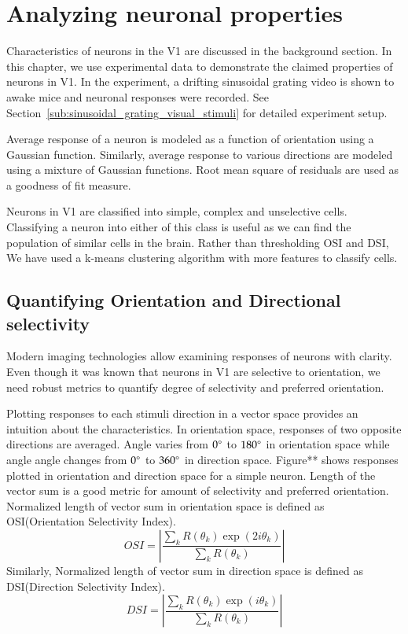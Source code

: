 \documentclass[MTech]{iitmdiss}
\begin{document}
\chapter{Analyzing neuronal properties} %
\label{chap:searchmotif}
Characteristics of neurons in the V1 are discussed in the background section. In this chapter, we use experimental data to demonstrate the claimed properties of neurons in V1. In the experiment, a drifting sinusoidal grating video is shown to awake mice and neuronal responses were recorded. See Section~\ref{sub:sinusoidal_grating_visual_stimuli} for detailed experiment setup. 

Average response of a neuron is modeled as a function of orientation using a Gaussian function. Similarly, average response to various directions are modeled using a mixture of Gaussian functions. Root mean square of residuals are used as a goodness of fit measure.

Neurons in V1 are classified into simple, complex and unselective cells. Classifying a neuron into either of this class is useful as we can find the population of similar cells in the brain. Rather than thresholding OSI and DSI, We have used a k-means clustering algorithm with more features to classify cells.
\section{Quantifying Orientation and Directional selectivity} %
\label{sec:quantifying_orientation_and_directional_selectivity}
Modern imaging technologies allow examining responses of neurons with clarity. Even though it was known that neurons in V1 are selective to orientation, we need robust metrics to quantify degree of selectivity and preferred orientation.

Plotting responses to each stimuli direction in a vector space provides an intuition about the characteristics. In orientation space, responses of two opposite directions are averaged. Angle varies from $0\degree$ to $180\degree$ in orientation space while angle angle changes from $0\degree$ to $360\degree$ in direction space. Figure** shows responses plotted in orientation and direction space for a simple neuron. Length of the vector sum is a good metric for amount of selectivity and preferred orientation. Normalized length of vector sum in orientation space is defined as OSI(Orientation Selectivity Index).
$$OSI = \left|\frac{\sum_{k} R(\theta_k) \exp(2i\theta_k)}{\sum_{k} R(\theta_k)}\right|$$
Similarly, Normalized length of vector sum in direction space is defined as DSI(Direction Selectivity Index).
$$DSI = \left|\frac{\sum_{k} R(\theta_k) \exp(i\theta_k)}{\sum_{k} R(\theta_k)}\right|$$
\end{document}
